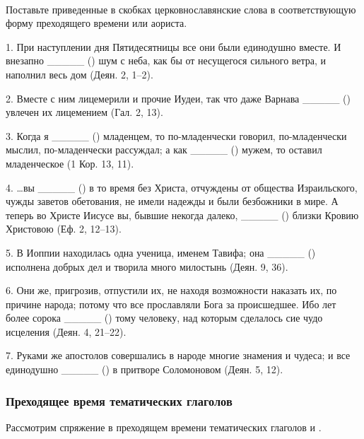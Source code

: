 \documentclass[11pt,a4paper,oneside]{memoir}
\newcommand{\exercise}{}
\begin{document}
                    \paragraph{\exercise}

    Поставьте приведенные в скобках церковнославянские слова в соответствующую форму преходящего времени или аориста.
    
    1. При наступлении дня Пятидесятницы все они были единодушно вместе. И внезапно _____ ({}) шум с неба, как бы от несущегося сильного ветра, и наполнил весь дом (Деян. 2, 1--2).
    
    2. Вместе с ним лицемерили и прочие Иудеи, так что даже Варнава _____ ({}) увлечен их лицемением (Гал. 2, 13).
    
    3. Когда я _____ ({}) младенцем, то по-младенчески говорил, по-младенчески мыслил, по-младенчески рассуждал; а как _____ ({}) мужем, то оставил младенческое (1 Кор. 13, 11).
    
    4. \ldots вы _____ ({}) в то время без Христа, отчуждены от общества Израильского, чужды заветов обетования, не имели надежды и были безбожники в мире. А теперь во Христе Иисусе вы, бывшие некогда далеко, _____ ({}) близки Кровию Христовою (Еф. 2, 12--13).
    
    5. В Иоппии находилась одна ученица, именем Тавифа; она _____ ({}) исполнена добрых дел и творила много милостынь (Деян. 9, 36).
    
    6. Они же, пригрозив, отпустили их, не находя возможности наказать их, по причине народа; потому что все прославляли Бога за происшедшее. Ибо лет более сорока _____ ({}) тому человеку, над которым сделалось сие чудо исцеления (Деян. 4, 21--22).
    
    7. Руками же апостолов совершались в народе многие знамения и чудеса; и все единодушно _____ ({}) в притворе Соломоновом (Деян. 5, 12).

                \subsubsection{Преходящее время тематических глаголов}

    Рассмотрим спряжение в преходящем времени тематических глаголов {} и {}.
\end{document}
